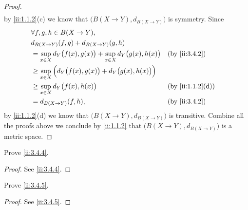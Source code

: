 \begin{proof}
\begin{align*}
  \end{align*}
  by \cref{ii:1.1.2}(c) we know that \(\big(B(X \to Y), d_{B(X \to Y)}\big)\) is symmetry.
  Since
  \begin{align*}
     & \forall f, g, h \in B(X \to Y),                                                                      \\
     & d_{B(X \to Y)}(f, g) + d_{B(X \to Y)}(g, h)                                                          \\
     & = \sup_{x \in X} d_Y\big(f(x), g(x)\big) + \sup_{x \in X} d_Y\big(g(x), h(x)\big) &  & \by{ii:3.4.2}    \\
     & \geq \sup_{x \in X} \Big(d_Y\big(f(x), g(x)\big) + d_Y\big(g(x), h(x)\big)\Big)                      \\
     & \geq \sup_{x \in X} d_Y\big(f(x), h(x)\big)                                       &  & \by{ii:1.1.2}[d] \\
     & = d_{B(X \to Y)}(f, h),                                                           &  & \by{ii:3.4.2}
  \end{align*}
  by \cref{ii:1.1.2}(d) we know that \(\big(B(X \to Y), d_{B(X \to Y)}\big)\) is transitive.
  Combine all the proofs above we conclude by \cref{ii:1.1.2} that \(\big(B(X \to Y), d_{B(X \to Y)}\big)\) is a metric space.
\end{proof}

\begin{ex}\label{ii:ex:3.4.2}
  Prove \cref{ii:3.4.4}.
\end{ex}

\begin{proof}
  See \cref{ii:3.4.4}.
\end{proof}

\begin{ex}\label{ii:ex:3.4.3}
  Prove \cref{ii:3.4.5}.
\end{ex}

\begin{proof}
  See \cref{ii:3.4.5}.
\end{proof}


